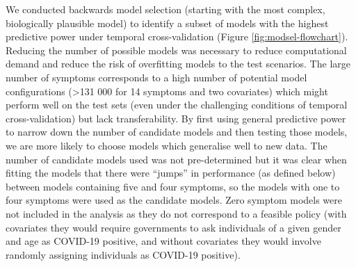 \documentclass[]{elsarticle} %
\begin{document}
We conducted backwards model selection (starting with the most complex, biologically plausible model) to identify a subset of models with the highest predictive power under temporal cross-validation (Figure \ref{fig:modsel-flowchart}).
Reducing the number of possible models was necessary to reduce computational demand and reduce the risk of overfitting models to the test scenarios.
The large number of symptoms corresponds to a high number of potential model configurations (\textgreater131 000 for 14 symptoms and two covariates) which might perform well on the test sets (even under the challenging conditions of temporal cross-validation) but lack transferability.
By first using general predictive power to narrow down the number of candidate models and then testing those models, we are more likely to choose models which generalise well to new data.
The number of candidate models used was not pre-determined but it was clear when fitting the models that there were ``jumps'' in performance (as defined below) between models containing five and four symptoms, so the models with one to four symptoms were used as the candidate models.
Zero symptom models were not included in the analysis as they do not correspond to a feasible policy (with covariates they would require governments to ask individuals of a given gender and age as COVID-19 positive, and without covariates they would involve randomly assigning individuals as COVID-19 positive).
\end{document}
